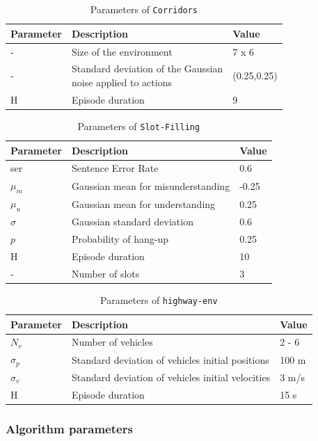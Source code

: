 \begin{table}[ht!]
    \centering
    \begin{tabularx}{1.0\textwidth}{lll}
        \toprule
        Parameter & Description & Value\tabularnewline
        \midrule
        - & Size of the environment & 7 x 6\tabularnewline
        - & \makecell[l]{Standard deviation of the Gaussian \\noise applied to actions} & (0.25,0.25)\tabularnewline
        H & Episode duration & 9\tabularnewline
        \bottomrule
    \end{tabularx}
    \caption{Parameters of \texttt{Corridors}}
    \label{tab:param-corridors}
\end{table}

\begin{table}[ht!]
    \centering
    \begin{tabularx}{1.0\textwidth}{lll}
        \toprule
        Parameter & Description & Value\tabularnewline
        \midrule
        ser & Sentence Error Rate & 0.6\tabularnewline
        $\mu_m$& Gaussian mean for misunderstanding & -0.25\tabularnewline
        $\mu_u$& Gaussian mean for understanding & 0.25\tabularnewline
        $\sigma$& Gaussian standard deviation & 0.6\tabularnewline
        $p$& Probability of hang-up & 0.25\tabularnewline
        H & Episode duration & 10\tabularnewline
        - & Number of slots & 3\tabularnewline
        \bottomrule
    \end{tabularx}
    \caption{Parameters of \texttt{Slot-Filling}}
    \label{tab:param-slot-filling}
\end{table}


\begin{table}[ht!]
    \centering
    \begin{tabularx}{1.0\textwidth}{lll}
        \toprule
        Parameter & Description & Value\tabularnewline
        \midrule
        $N_v$& Number of vehicles & 2 - 6\tabularnewline
        $\sigma_p$& Standard deviation of vehicles initial positions & 100 m\tabularnewline
        $\sigma_v$& Standard deviation of vehicles initial velocities & 3 m/s\tabularnewline
        H & Episode duration & 15 s\tabularnewline
        \bottomrule
    \end{tabularx}

    \caption{Parameters of \texttt{highway-env}}
    \label{tab:param-highway-env}
\end{table}

\subsubsection{Algorithm parameters}
\label{sec:algorithms-parameters}

